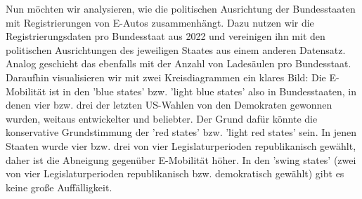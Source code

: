 Nun möchten wir analysieren, wie die politischen Ausrichtung der Bundesstaaten mit Registrierungen von E-Autos zusammenhängt. Dazu nutzen wir die Registrierungsdaten pro Bundesstaat aus 2022 und vereinigen ihn mit den politischen Ausrichtungen des jeweiligen Staates aus einem anderen Datensatz. Analog geschieht das ebenfalls mit der Anzahl von Ladesäulen pro Bundesstaat.
Daraufhin visualisieren wir mit zwei Kreisdiagrammen ein klares Bild: Die E-Mobilität ist in den 'blue states' bzw. 'light blue states'  also in Bundesstaaten, in denen vier bzw. drei der letzten US-Wahlen von den Demokraten gewonnen wurden, weitaus entwickelter und beliebter. Der Grund dafür könnte die konservative Grundstimmung der 'red states' bzw. 'light red states' sein. In jenen Staaten wurde vier bzw. drei von vier Legislaturperioden republikanisch gewählt, daher ist die Abneigung gegenüber E-Mobilität höher. In den 'swing states' (zwei von vier Legislaturperioden republikanisch bzw. demokratisch gewählt) gibt es keine große Auffälligkeit.



